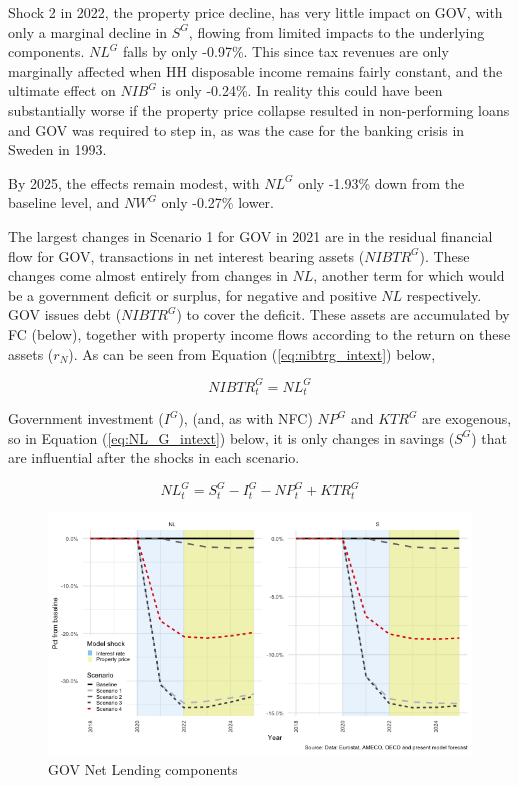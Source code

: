 \documentclass[
]{book}
\begin{document}
Shock 2 in 2022, the property price decline, has very little impact on GOV, with only a marginal decline in \(S^G\), flowing from limited impacts to the underlying components. \(NL^G\) falls by only -0.97\%. This since tax revenues are only marginally affected when HH disposable income remains fairly constant, and the ultimate effect on \(NIB^G\) is only -0.24\%. In reality this could have been substantially worse if the property price collapse resulted in non-performing loans and GOV was required to step in, as was the case for the banking crisis in Sweden in 1993. \citep{englund1999}

By 2025, the effects remain modest, with \(NL^G\) only -1.93\% down from the baseline level, and \(NW^G\) only -0.27\% lower.

The largest changes in Scenario 1 for GOV in 2021 are in the residual financial flow for GOV, transactions in net interest bearing assets (\(NIBTR^G\)). These changes come almost entirely from changes in \(NL\), another term for which would be a government deficit or surplus, for negative and positive \(NL\) respectively. GOV issues debt (\(NIBTR^G\)) to cover the deficit. These assets are accumulated by FC (below), together with property income flows according to the return on these assets (\(r_N\)). As can be seen from Equation (\ref{eq:nibtrg_intext}) below,

\begin{equation}
NIBTR^G_t = NL^G_t
\label{eq:nibtrg_intext}
\end{equation}

Government investment (\(I^G\)), (and, as with NFC) \(NP^G\) and \(KTR^G\) are exogenous, so in Equation (\ref{eq:NL_G_intext}) below, it is only changes in savings (\(S^G\)) that are influential after the shocks in each scenario.

\begin{equation}
NL^G_t = S^G_t - I^G_t - NP^G_t + KTR^G_t
\label{eq:NL_G_intext}
\end{equation}

\begin{figure}[H]
\includegraphics[width=0.95\linewidth]{figures/fl-fi-sfc-plot-GOV-indicators-nl-1} \caption{GOV Net Lending components}\label{fig:fl-fi-sfc-plot-GOV-indicators-nl}
\end{figure}
\end{document}
